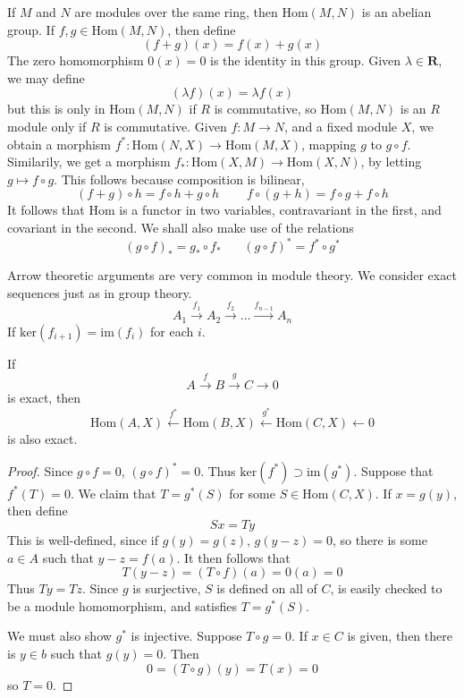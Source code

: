 If $M$ and $N$ are modules over the same ring, then $\text{Hom}(M,N)$ is an abelian group. If $f,g \in \text{Hom}(M,N)$, then define
%
\[ (f + g)(x) = f(x) + g(x) \]
%
The zero homomorphism $0(x) = 0$ is the identity in this group. Given $\lambda \in \mathbf{R}$, we may define
%
\[ (\lambda f)(x) = \lambda f(x) \]
%
but this is only in $\text{Hom}(M,N)$ if $R$ is commutative, so $\text{Hom}(M,N)$ is an $R$ module only if $R$ is commutative. Given $f: M \to N$, and a fixed module $X$, we obtain a morphism $f^*: \text{Hom}(N,X) \to \text{Hom}(M,X)$, mapping $g$ to $g \circ f$. Similarily, we get a morphism $f_*: \text{Hom}(X,M) \to \text{Hom}(X,N)$, by letting $g \mapsto f \circ g$. This follows because composition is bilinear,
%
\[ (f + g) \circ h = f \circ h + g \circ h\ \ \ \ \ \ \ \ \ \ f \circ (g + h) = f \circ g + f \circ h \]
It follows that $\text{Hom}$ is a functor in two variables, contravariant in the first, and covariant in the second. We shall also make use of the relations
%
\[ (g \circ f)_* = g_* \circ f_*\ \ \ \ \ \ \ \ (g \circ f)^* = f^* \circ g^* \]

Arrow theoretic arguments are very common in module theory. We consider exact sequences just as in group theory.
%
\[ A_1 \xrightarrow{f_1} A_2 \xrightarrow{f_2} \dots \xrightarrow{f_{n-1}} A_n \]
%
If $\text{ker}(f_{i+1}) = \text{im}(f_i)$ for each $i$.

\begin{theorem}
    If
    \[ A \xrightarrow{f} B \xrightarrow{g} C \xrightarrow{} 0 \]
    is exact, then
    \[ \text{Hom}(A,X) \xleftarrow{f^*} \text{Hom}(B,X) \xleftarrow{g^*} \text{Hom}(C,X) \xleftarrow{} 0 \]
    is also exact.
\end{theorem}
\begin{proof}
    Since $g \circ f = 0$,  $(g \circ f)^* = 0$. Thus $\text{ker}(f^*) \supset \text{im}(g^*)$. Suppose that $f^*(T) = 0$. We claim that $T = g^*(S)$ for some $S \in \text{Hom}(C,X)$. If $x = g(y)$, then define
    \[ Sx = Ty \]
    This is well-defined, since if $g(y) = g(z)$, $g(y - z) = 0$, so there is some $a \in A$ such that $y - z = f(a)$. It then follows that
    \[ T(y - z) = (T \circ f)(a) = 0(a) = 0 \]
    Thus $Ty = Tz$. Since $g$ is surjective, $S$ is defined on all of $C$, is easily checked to be a module homomorphism, and satisfies $T = g^*(S)$.

    We must also show $g^*$ is injective. Suppose $T \circ g = 0$. If $x \in C$ is given, then there is $y \in b$ such that $g(y) = 0$. Then
    \[ 0 = (T \circ g)(y) = T(x) = 0 \]
    so $T = 0$.
\end{proof}

